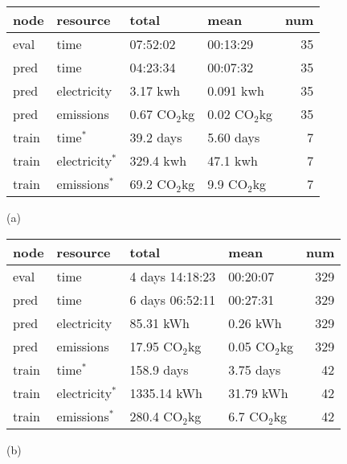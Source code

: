 \documentclass[10pt,twocolumn,letterpaper]{article}
\newcommand{\cotwo}{\ensuremath{\mathrm{CO_2}}}
\begin{document}
\begin{table}[t]
    \centering
\begin{tabular}{llllr}
\toprule
        node & resource &           total &            mean &  num \\
\midrule
eval  & time            & 07:52:02 &  00:13:29 &   35 \\
pred  & time            & 04:23:34 &  00:07:32 &   35 \\
pred  & electricity     & 3.17 kwh &     0.091 kwh&   35 \\
pred  & emissions       & 0.67 \cotwo kg &     0.02 \cotwo kg &   35 \\
train &   time$^{*}$    & 39.2 days  & 5.60 days&   7 \\
train &   electricity$^{*}$  & 329.4 kwh &     47.1 kwh &   7 \\
train &   emissions$^{*}$ & 69.2 \cotwo kg &     9.9 \cotwo kg &   7 \\
\bottomrule
\end{tabular}

(a)

\begin{tabular}{llllr}
\toprule
        node & resource &           total &            mean &  num \\
\midrule
eval & time & 4 days 14:18:23 & 00:20:07 &  329 \\
pred & time & 6 days 06:52:11 & 00:27:31 &  329 \\
pred & electricity &       85.31 kWh &        0.26 kWh &  329 \\
pred & emissions &       17.95 \cotwo kg &        0.05 \cotwo kg &  329 \\

train &   time$^{*}$ &        158.9 days &         3.75 days &   42 \\
train & electricity$^{*}$  &   1335.14 kWh &       31.79 kWh &   42 \\
train & emissions$^{*}$ &   280.4 \cotwo kg &        6.7 \cotwo kg &   42 \\
\bottomrule
\end{tabular}

(b)


\end{table}
\end{document}
